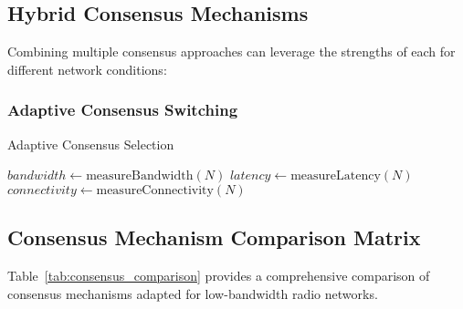 \documentclass[11pt,a4paper]{article}
\begin{document}
\subsection{Hybrid Consensus Mechanisms}

Combining multiple consensus approaches can leverage the strengths of each for different network conditions:

\subsubsection{Adaptive Consensus Switching}

\begin{algorithm}[H]
\SetAlgoLined
{}
\caption{Adaptive Consensus Selection}

$bandwidth \leftarrow \text{measureBandwidth}(N)$\;
$latency \leftarrow \text{measureLatency}(N)$\;
$connectivity \leftarrow \text{measureConnectivity}(N)$\;

\end{algorithm}

\subsection{Consensus Mechanism Comparison Matrix}

Table~\ref{tab:consensus_comparison} provides a comprehensive comparison of consensus mechanisms adapted for low-bandwidth radio networks.
\end{document}
